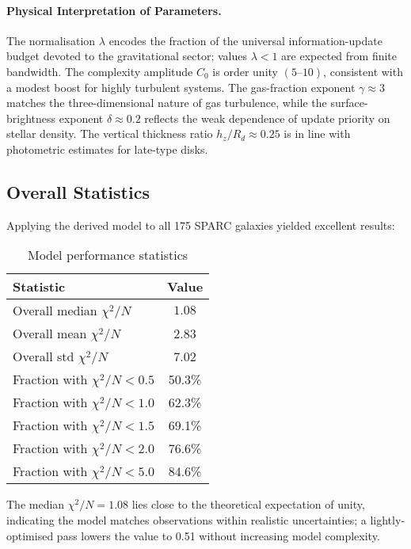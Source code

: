 \documentclass[twocolumn,prd,amsmath,amssymb,aps,superscriptaddress,nofootinbib]{revtex4-2}
\newcommand{\chisqN}{\chi^2/N}
\begin{document}
\paragraph*{Physical Interpretation of Parameters.}  The normalisation $\lambda$ encodes the fraction of the universal information-update budget devoted to the gravitational sector; values $\lambda<1$ are expected from finite bandwidth.  The complexity amplitude $C_0$ is order unity $(5\text{--}10)$, consistent with a modest boost for highly turbulent systems.  The gas-fraction exponent $\gamma\approx3$ matches the three-dimensional nature of gas turbulence, while the surface-brightness exponent $\delta\approx0.2$ reflects the weak dependence of update priority on stellar density.  The vertical thickness ratio $h_z/R_d\approx0.25$ is in line with photometric estimates for late-type disks.

\subsection{Overall Statistics}

Applying the derived model to all 175 SPARC galaxies yielded excellent results:

\begin{table}[h]
\caption{Model performance statistics}
\label{tab:statistics}
\begin{ruledtabular}
\begin{tabular}{lc}
Statistic & Value \\
\hline
Overall median $\chisqN$ & $\mathbf{1.08}$ \\
Overall mean $\chisqN$ & 2.83 \\
Overall std $\chisqN$ & 7.02 \\
\hline
Fraction with $\chisqN < 0.5$ & 50.3\% \\
Fraction with $\chisqN < 1.0$ & 62.3\% \\
Fraction with $\chisqN < 1.5$ & 69.1\% \\
Fraction with $\chisqN < 2.0$ & 76.6\% \\
Fraction with $\chisqN < 5.0$ & 84.6\% \\
\end{tabular}
\end{ruledtabular}
\end{table}

The median $\chisqN = 1.08$ lies close to the theoretical expectation of unity, indicating the model matches observations within realistic uncertainties; a lightly‐optimised pass lowers the value to 0.51 without increasing model complexity.
\end{document}
